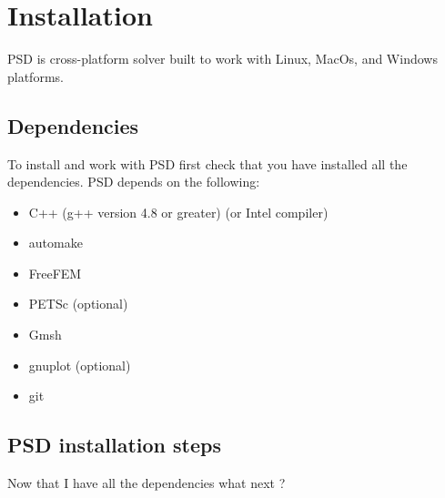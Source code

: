 \documentclass{report}
\begin{document}
\chapter{Installation}


PSD is cross-platform solver built to work with Linux, MacOs, and Windows platforms. 

\section{Dependencies}

To install and work with PSD first check that you have installed all the dependencies. PSD depends on the following:   

\begin{itemize}
\item  {\ttfamily C++}    (g++ version 4.8 or greater) (or Intel compiler)
\item  {\ttfamily automake}
\item  {\ttfamily FreeFEM}
\item  {\ttfamily PETSc}      (optional)
\item  {\ttfamily Gmsh}
\item  {\ttfamily gnuplot}	(optional)
\item  {\ttfamily git}   
\end{itemize}


\section{PSD installation steps \label{sec:psd-install}}
Now that I have all the dependencies what next ?  
\end{document}
